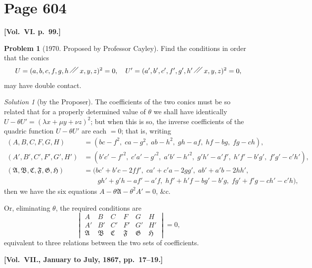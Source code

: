 \documentclass[12pt,a4paper]{article}
\theoremstyle{plain}
\theoremstyle{definition}
\newtheorem{problem}{Problem}
\theoremstyle{remark}
\newtheorem*{solution}{Solution}
\begin{document}
\section*{Page 604}
\setcounter{page}{604}

\medskip\noindent\textbf{[Vol.~VI. p.~99.]}

\begin{problem}[1970. Proposed by Professor Cayley]
Find the conditions in order that the conics
\[
U = (a, b, c, f, g, h \,\raisebox{0.5ex}{\ensuremath{\diagup\kern-0.5em\diagup}}\, x, y, z)^2 = 0, \quad
U' = (a', b', c', f', g', h' \,\raisebox{0.5ex}{\ensuremath{\diagup\kern-0.5em\diagup}}\, x, y, z)^2 = 0,
\]
may have double contact.
\end{problem}

\begin{solution}[by the Proposer]
The coefficients of the two conics must be so related that for a properly determined value of $\theta$ we shall have identically $U - \theta U' = (\lambda x + \mu y + \nu z)^2$; but when this is so, the inverse coefficients of the quadric function $U - \theta U'$ are each $= 0$; that is, writing
\begin{align*}
(A, B, C, F, G, H) &= (bc - f^2,\; ca - g^2,\; ab - h^2,\; gh - af,\; hf - bg,\; fg - ch),\\
(A', B', C', F', G', H') &= (b'c' - f'^2,\; c'a' - g'^2,\; a'b' - h'^2,\; g'h' - a'f',\; h'f' - b'g',\; f'g' - c'h'),\\
(\mathfrak{A}, \mathfrak{B}, \mathfrak{C}, \mathfrak{F}, \mathfrak{G}, \mathfrak{H}) &= (bc' + b'c - 2ff',\; ca' + c'a - 2gg',\; ab' + a'b - 2hh',\\
&\qquad gh' + g'h - af' - a'f,\; hf' + h'f - bg' - b'g,\; fg' + f'g - ch' - c'h),
\end{align*}
then we have the six equations $A - \theta\mathfrak{A} - \theta^2 A' = 0$, \&c.

Or, eliminating $\theta$, the required conditions are
\[
\begin{vmatrix}
A & B & C & F & G & H \\
A' & B' & C' & F' & G' & H' \\
\mathfrak{A} & \mathfrak{B} & \mathfrak{C} & \mathfrak{F} & \mathfrak{G} & \mathfrak{H}
\end{vmatrix} = 0,
\]
equivalent to three relations between the two sets of coefficients.
\end{solution}

\medskip\noindent\textbf{[Vol.~VII., January to July, 1867, pp.~17--19.]}
\end{document}
